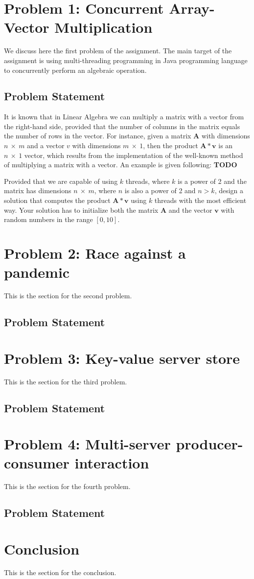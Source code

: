 \documentclass[acmlarge]{acmart}
\newcommand{\todo}{{\color{red}\textbf{TODO} }}
\begin{document}
\section{Problem 1: Concurrent Array-Vector Multiplication}
\label{section:problem1}
We discuss here the first problem of the assignment. The main target of the assignment is using multi-threading programming in Java programming language to concurrently perform an algebraic operation.
\subsection{Problem Statement}
It is known that in Linear Algebra we can multiply a matrix with a vector from the right-hand side, provided that the number of columns in the matrix equals the number of rows in the vector. For instance, given a matrix $\mathbf{A}$ with dimensions $n~\times~m$ and a vector $v$ with dimensions $m~\times~1$, then the product $\mathbf{A}*\mathbf{v}$ is an $n~\times~1$ vector, which results from the implementation of the well-known method of multiplying a matrix with a vector. An example is given following: \todo

Provided that we are capable of using $k$ threads, where $k$ is a power of 2 and the matrix has dimensions $n~\times~m$, where $n$ is also a power of 2 and $n>k$, design a solution that computes the product $\mathbf{A}*\mathbf{v}$ using $k$ threads with the most efficient way. Your solution has to initialize both the matrix $\mathbf{A}$ and the vector $\mathbf{v}$ with random numbers in the range $[0, 10]$.

\section{Problem 2: Race against a pandemic}
\label{section:problem2}
This is the section for the second problem.
\subsection{Problem Statement}

\section{Problem 3: Key-value server store}
\label{section:problem3}
This is the section for the third problem.
\subsection{Problem Statement}

\section{Problem 4: Multi-server producer-consumer interaction}
\label{section:problem4}
This is the section for the fourth problem.
\subsection{Problem Statement}

\section{Conclusion}
\label{section:conclusion}
This is the section for the conclusion.
\end{document}
